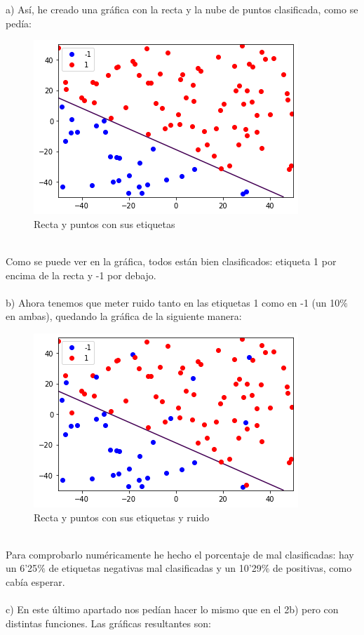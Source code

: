 \documentclass[12pt]{article}
\begin{document}
a) Así, he creado una gráfica con la recta y la nube de puntos clasificada, como se pedía:
\begin{figure}[h]
\centering
\includegraphics[scale=0.75]{Images/Ej2a.png} 
\caption{Recta y puntos con sus etiquetas}
\label{etiqueta}
\end{figure}
\\
Como se puede ver en la gráfica, todos están bien clasificados: etiqueta 1 por encima de la recta y -1 por debajo. \\\\
b) Ahora tenemos que meter ruido tanto en las etiquetas 1 como en -1 (un 10$ \% $ en ambas), quedando la gráfica de la siguiente manera:
\begin{figure}[h]
\centering
\includegraphics[scale=0.75]{Images/Ej2b.png} 
\caption{Recta y puntos con sus etiquetas y ruido}
\label{etiqueta}
\end{figure}
\\
Para comprobarlo numéricamente he hecho el porcentaje de mal clasificadas: hay un 6'25$\%$ de etiquetas negativas mal clasificadas y un 10'29$\%$ de positivas, como cabía esperar.\\\\
c) En este último apartado nos pedían hacer lo mismo que en el 2b) pero con distintas funciones. Las gráficas resultantes son:\\\\
\end{document}
